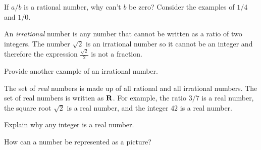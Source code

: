 \documentclass[a4paper,oneside,12pt]{article}
\begin{document}
\begin{exercise}
If $a/b$ is a rational number, why can't $b$ be zero?  Consider the
examples of $1/4$ and $1/0$.
\end{exercise}


An \emph{irrational} number is any number that cannot be written as a
ratio of two integers.  The number $\sqrt{2}$ is an irrational number
so it cannot be an integer and therefore the expression
$\displaystyle{\frac{\sqrt{2}}{2}}$ is not a fraction.

\begin{exercise}
Provide another example of an irrational number.
\end{exercise}


The set of \emph{real} numbers is made up of all rational and all
irrational numbers.  The set of real numbers is written as $\mathbf{R}$.  For
example, the ratio $3/7$ is a real number, the square root $\sqrt{2}$
is a real number, and the integer $42$ is a real number.

\begin{exercise}
Explain why any integer is a real number.
\end{exercise}


\begin{exercise}
How can a number be represented as a picture?
\end{exercise}

\end{document}
